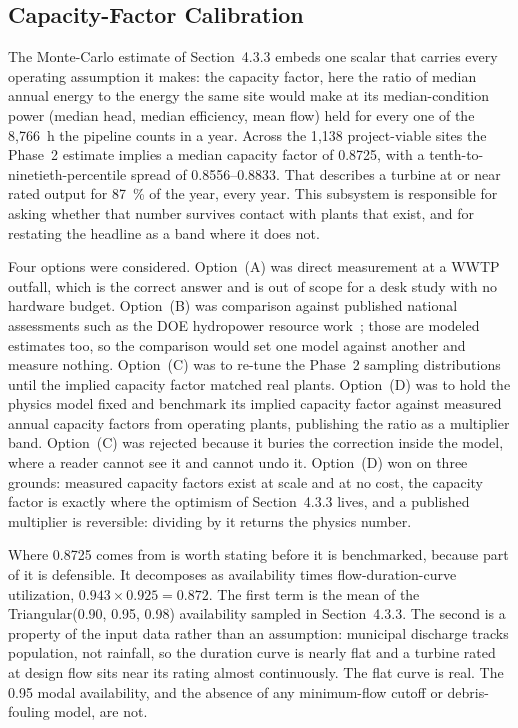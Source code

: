 \documentclass[12pt,letterpaper]{report}
\begin{document}
\subsection{Capacity-Factor Calibration}

The Monte-Carlo estimate of Section~4.3.3 embeds one scalar that carries every
operating assumption it makes: the capacity factor, here the ratio of median
annual energy to the energy the same site would make at its median-condition
power (median head, median efficiency, mean flow) held for every one of the
8{,}766~h the pipeline counts in a year. Across the 1{,}138 project-viable sites
the Phase~2 estimate implies a
median capacity factor of 0.8725, with a tenth-to-ninetieth-percentile spread of
0.8556--0.8833. That describes a turbine at or near rated output for 87~\% of the
year, every year. This subsystem is responsible for asking whether that number
survives contact with plants that exist, and for restating the headline as a band
where it does not.

Four options were considered. Option~(A) was direct measurement at a WWTP outfall,
which is the correct answer and is out of scope for a desk study with no hardware
budget. Option~(B) was comparison against published national assessments such as
the DOE hydropower resource work~\cite{doe_vision, ornl2014}; those are modeled
estimates too, so the comparison would set one model against another and measure
nothing. Option~(C) was to re-tune the Phase~2 sampling distributions until the
implied capacity factor matched real plants. Option~(D) was to hold the physics
model fixed and benchmark its implied capacity factor against measured annual
capacity factors from operating plants, publishing the ratio as a multiplier
band. Option~(C) was rejected because it buries the correction inside the model,
where a reader cannot see it and cannot undo it. Option~(D) won on three grounds:
measured capacity factors exist at scale and at no cost, the capacity factor is
exactly where the optimism of Section~4.3.3 lives, and a published multiplier is
reversible: dividing by it returns the physics number.

Where 0.8725 comes from is worth stating before it is benchmarked, because part
of it is defensible. It decomposes as availability times flow-duration-curve
utilization, $0.943 \times 0.925 = 0.872$. The first term is the mean of the
Triangular(0.90, 0.95, 0.98) availability sampled in Section~4.3.3. The second is
a property of the input data rather than an assumption: municipal discharge
tracks population, not rainfall, so the duration curve is nearly flat and a
turbine rated at design flow sits near its rating almost continuously. The flat
curve is real. The 0.95 modal availability, and the absence of any minimum-flow
cutoff or debris-fouling model, are not.
\end{document}
